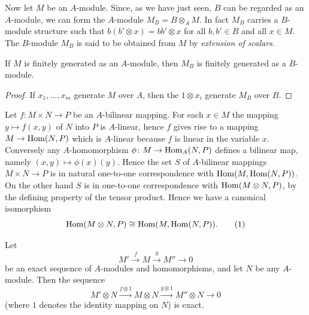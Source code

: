 Now let $M$ be an $A$-module. Since, as we have just seen, $B$ can be regarded as an $A$-module, we can form the $A$-module $M_B = B \otimes_A M$. In fact $M_B$ carries a $B$-module structure such that $b(b' \otimes x) = bb' \otimes x$ for all $b, b' \in B$ and all $x \in M$. The $B$-module $M_B$ is said to be obtained from $M$ by \emph{extension of scalars}.

\begin{proposition}\label{prop:finitely-generated-extension}
If $M$ is finitely generated as an $A$-module, then $M_B$ is finitely generated as a $B$-module.
\end{proposition}

\begin{proof}
If $x_1, \ldots, x_m$ generate $M$ over $A$, then the $1 \otimes x_i$ generate $M_B$ over $B$.
\end{proof}


Let $f \colon M \times N \to P$ be an $A$-bilinear mapping. For each $x \in M$ the mapping $y \mapsto f(x, y)$ of $N$ into $P$ is $A$-linear, hence $f$ gives rise to a mapping $M \to \operatorname{Hom}(N, P)$ which is $A$-linear because $f$ is linear in the variable $x$. Conversely any $A$-homomorphism $\phi \colon M \to \operatorname{Hom}_A(N, P)$ defines a bilinear map, namely $(x, y) \mapsto \phi(x)(y)$. Hence the set $S$ of $A$-bilinear mappings $M \times N \to P$ is in natural one-to-one correspondence with $\operatorname{Hom}(M, \operatorname{Hom}(N, P))$. On the other hand $S$ is in one-to-one correspondence with $\operatorname{Hom}(M \otimes N, P)$, by the defining property of the tensor product. Hence we have a canonical isomorphism
\begin{equation}\label{eq:tensor-hom-adjunction}
    \operatorname{Hom}(M \otimes N, P) \cong \operatorname{Hom}(M, \operatorname{Hom}(N, P)). \tag{1}
\end{equation}

\begin{proposition}\label{prop:tensor-right-exact}
Let \begin{equation}\label{eq:exact-sequence}
    M' \stackrel{f}{\longrightarrow} M \stackrel{g}{\longrightarrow} M'' \longrightarrow 0 \tag{2}
\end{equation}
be an exact sequence of $A$-modules and homomorphisms, and let $N$ be any $A$-module. Then the sequence
\begin{equation}\label{eq:tensored-sequence}
    M' \otimes N \xrightarrow{f \otimes 1} M \otimes N \xrightarrow{g \otimes 1} M'' \otimes N \longrightarrow 0 \tag{3}
\end{equation}
(where $1$ denotes the identity mapping on $N$) is exact.
\end{proposition}


